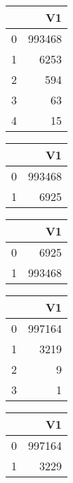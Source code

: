 \bigskip\bigskip
\centering
\begin{tabular}{rr}
  \hline
 & V1 \\ 
  \hline
0 & 993468 \\ 
  1 & 6253 \\ 
  2 & 594 \\ 
  3 &  63 \\ 
  4 &  15 \\ 
   \hline
\end{tabular}

\bigskip\bigskip
\centering
\begin{tabular}{rr}
  \hline
 & V1 \\ 
  \hline
0 & 993468 \\ 
  1 & 6925 \\ 
   \hline
\end{tabular}

\bigskip\bigskip
\centering
\begin{tabular}{rr}
  \hline
 & V1 \\ 
  \hline
0 & 6925 \\ 
  1 & 993468 \\ 
   \hline
\end{tabular}

\bigskip\bigskip
\centering
\begin{tabular}{rr}
  \hline
 & V1 \\ 
  \hline
0 & 997164 \\ 
  1 & 3219 \\ 
  2 &   9 \\ 
  3 &   1 \\ 
   \hline
\end{tabular}

\bigskip\bigskip
\centering
\begin{tabular}{rr}
  \hline
 & V1 \\ 
  \hline
0 & 997164 \\ 
  1 & 3229 \\ 
   \hline
\end{tabular}

